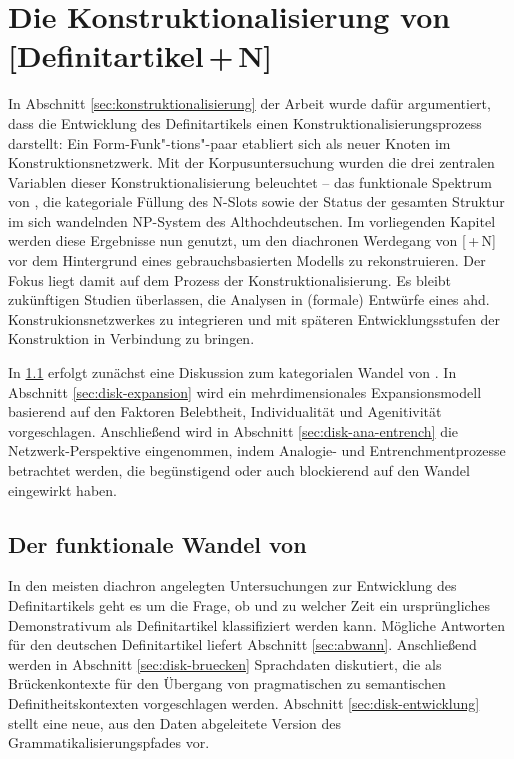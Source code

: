 \chapter{Die Konstruktionalisierung von [Definitartikel\,+\,N]} \label{bicpic}

In Abschnitt \ref{sec:konstruktionalisierung} der Arbeit wurde dafür argumentiert, dass die Entwicklung des Definitartikels einen Konstruktionalisierungsprozess darstellt: Ein Form-Funk"-tions"-paar etabliert sich als neuer Knoten im Konstruktionsnetzwerk. Mit der Korpusuntersuchung wurden die drei zentralen Variablen dieser Konstruktionalisierung beleuchtet -- das funktionale Spektrum von , die kategoriale Füllung des N-Slots sowie der Status der gesamten Struktur im sich wandelnden NP-System des Althochdeutschen. Im vorliegenden Kapitel werden diese Ergebnisse nun genutzt, um den diachronen Werdegang von [\,+\,N] vor dem Hintergrund eines gebrauchsbasierten Modells zu rekonstruieren. 
Der Fokus liegt damit auf dem Prozess der Konstruktionalisierung. Es bleibt zukünftigen Studien überlassen, die Analysen in (formale) Entwürfe eines ahd. Konstrukionsnetzwerkes zu integrieren und  mit späteren Entwicklungsstufen der Konstruktion in Verbindung zu bringen. 

In \ref{diskussion:der} erfolgt zunächst eine Diskussion zum kategorialen Wandel von .  In Abschnitt \ref{sec:disk-expansion} wird ein mehrdimensionales Expansionsmodell basierend auf den Faktoren Belebtheit,  Individualität und Agenitivität vorgeschlagen. Anschließend wird in Abschnitt \ref{sec:disk-ana-entrench} die Netzwerk-Perspektive eingenommen, indem Analogie- und Entrenchmentprozesse betrachtet werden, die begünstigend oder auch blockierend auf den Wandel eingewirkt haben. 

\section{Der funktionale Wandel von } \label{diskussion:der}

In den meisten diachron angelegten Untersuchungen zur Entwicklung des Definitartikels geht es um die Frage, ob und zu welcher Zeit ein ursprüngliches Demonstrativum als Definitartikel klassifiziert werden kann. Mögliche Antworten für den deutschen Definitartikel liefert Abschnitt \ref{sec:abwann}. Anschließend werden in Abschnitt \ref{sec:disk-bruecken} Sprachdaten diskutiert, die  als Brückenkontexte für den Übergang von pragmatischen zu semantischen Definitheitskontexten vorgeschlagen werden. Abschnitt \ref{sec:disk-entwicklung} stellt eine neue, aus den Daten abgeleitete Version des Grammatikalisierungspfades vor. 

